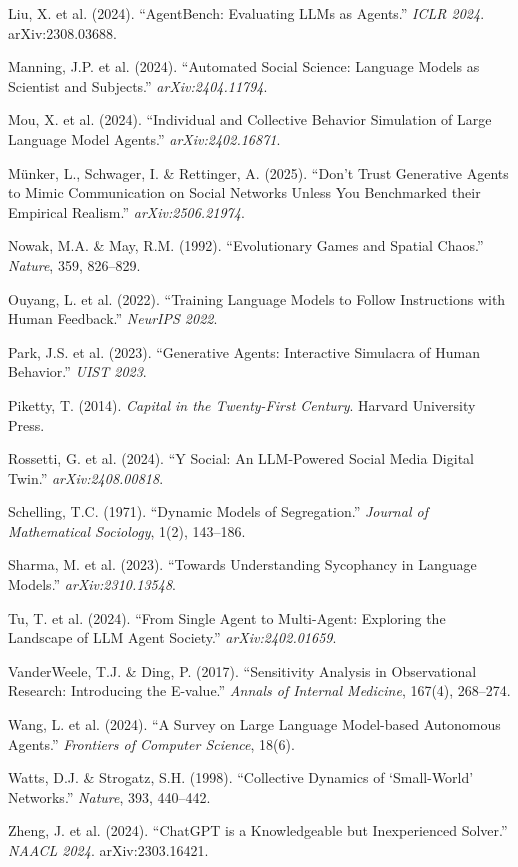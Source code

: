 {Liu, X. et al. (2024). ``AgentBench: Evaluating LLMs as Agents.'' \textit{ICLR 2024}. arXiv:2308.03688.\par\smallskip
Manning, J.P. et al. (2024). ``Automated Social Science: Language Models as Scientist and Subjects.'' \textit{arXiv:2404.11794}.\par\smallskip
Mou, X. et al. (2024). ``Individual and Collective Behavior Simulation of Large Language Model Agents.'' \textit{arXiv:2402.16871}.\par\smallskip
Münker, L., Schwager, I. \& Rettinger, A. (2025). ``Don't Trust Generative Agents to Mimic Communication on Social Networks Unless You Benchmarked their Empirical Realism.'' \textit{arXiv:2506.21974}.\par\smallskip
Nowak, M.A. \& May, R.M. (1992). ``Evolutionary Games and Spatial Chaos.'' \textit{Nature}, 359, 826--829.\par\smallskip
Ouyang, L. et al. (2022). ``Training Language Models to Follow Instructions with Human Feedback.'' \textit{NeurIPS 2022}.\par\smallskip
Park, J.S. et al. (2023). ``Generative Agents: Interactive Simulacra of Human Behavior.'' \textit{UIST 2023}.\par\smallskip
Piketty, T. (2014). \textit{Capital in the Twenty-First Century}. Harvard University Press.\par\smallskip
Rossetti, G. et al. (2024). ``Y Social: An LLM-Powered Social Media Digital Twin.'' \textit{arXiv:2408.00818}.\par\smallskip
Schelling, T.C. (1971). ``Dynamic Models of Segregation.'' \textit{Journal of Mathematical Sociology}, 1(2), 143--186.\par\smallskip
Sharma, M. et al. (2023). ``Towards Understanding Sycophancy in Language Models.'' \textit{arXiv:2310.13548}.\par\smallskip
Tu, T. et al. (2024). ``From Single Agent to Multi-Agent: Exploring the Landscape of LLM Agent Society.'' \textit{arXiv:2402.01659}.\par\smallskip
VanderWeele, T.J. \& Ding, P. (2017). ``Sensitivity Analysis in Observational Research: Introducing the E-value.'' \textit{Annals of Internal Medicine}, 167(4), 268--274.\par\smallskip
Wang, L. et al. (2024). ``A Survey on Large Language Model-based Autonomous Agents.'' \textit{Frontiers of Computer Science}, 18(6).\par\smallskip
Watts, D.J. \& Strogatz, S.H. (1998). ``Collective Dynamics of `Small-World' Networks.'' \textit{Nature}, 393, 440--442.\par\smallskip
Zheng, J. et al. (2024). ``ChatGPT is a Knowledgeable but Inexperienced Solver.'' \textit{NAACL 2024}. arXiv:2303.16421.\par\smallskip

}
